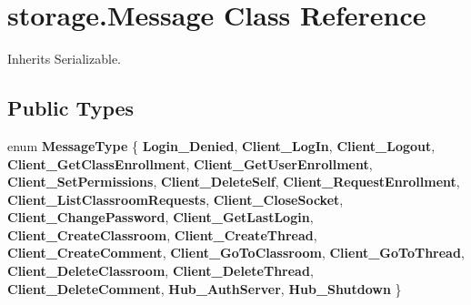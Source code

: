 \hypertarget{classstorage_1_1_message}{
\section{storage.\-Message \-Class \-Reference}
\label{classstorage_1_1_message}
}


\-Inherits \-Serializable.

\subsection*{\-Public \-Types}
\begin{DoxyCompactItemize}
\item 
enum {\bfseries \-Message\-Type} \{ \*
{\bfseries \-Login\-\_\-\-Denied}, 
{\bfseries \-Client\-\_\-\-Log\-In}, 
{\bfseries \-Client\-\_\-\-Logout}, 
{\bfseries \-Client\-\_\-\-Get\-Class\-Enrollment}, 
\*
{\bfseries \-Client\-\_\-\-Get\-User\-Enrollment}, 
{\bfseries \-Client\-\_\-\-Set\-Permissions}, 
{\bfseries \-Client\-\_\-\-Delete\-Self}, 
{\bfseries \-Client\-\_\-\-Request\-Enrollment}, 
\*
{\bfseries \-Client\-\_\-\-List\-Classroom\-Requests}, 
{\bfseries \-Client\-\_\-\-Close\-Socket}, 
{\bfseries \-Client\-\_\-\-Change\-Password}, 
{\bfseries \-Client\-\_\-\-Get\-Last\-Login}, 
\*
{\bfseries \-Client\-\_\-\-Create\-Classroom}, 
{\bfseries \-Client\-\_\-\-Create\-Thread}, 
{\bfseries \-Client\-\_\-\-Create\-Comment}, 
{\bfseries \-Client\-\_\-\-Go\-To\-Classroom}, 
\*
{\bfseries \-Client\-\_\-\-Go\-To\-Thread}, 
{\bfseries \-Client\-\_\-\-Delete\-Classroom}, 
{\bfseries \-Client\-\_\-\-Delete\-Thread}, 
{\bfseries \-Client\-\_\-\-Delete\-Comment}, 
\*
{\bfseries \-Hub\-\_\-\-Auth\-Server}, 
{\bfseries \-Hub\-\_\-\-Shutdown}
 \}
\end{DoxyCompactItemize}
